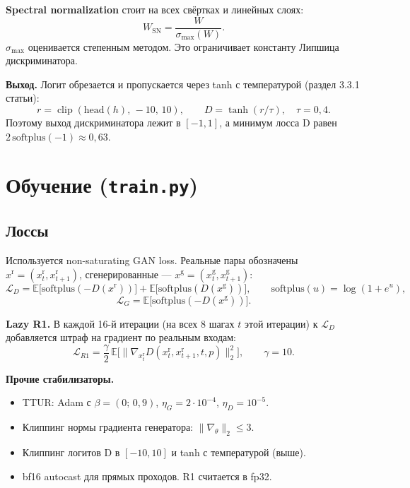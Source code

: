 \documentclass[11pt,a4paper]{article}
\newcommand{\code}[1]{\texttt{#1}}
\newcommand{\E}{\mathbb{E}}
\begin{document}
\textbf{Spectral normalization} стоит на всех свёртках и линейных слоях:
\[
  W_{\mathrm{SN}} = \frac{W}{\sigma_{\max}(W)}.
\]
$\sigma_{\max}$ оценивается степенным методом. Это ограничивает константу Липшица дискриминатора.

\textbf{Выход.} Логит обрезается и пропускается через tanh с температурой (раздел 3.3.1 статьи):
\[
  r = \operatorname{clip}(\mathrm{head}(h),\,-10,\,10),\qquad D = \tanh(r/\tau),\quad \tau=0{,}4.
\]
Поэтому выход дискриминатора лежит в $[-1,1]$, а минимум лосса D равен $2\,\mathrm{softplus}(-1)\approx0{,}63$.

\section{Обучение (\code{train.py})}

\subsection{Лоссы}
Используется non-saturating GAN loss. Реальные пары обозначены $x^{\mathrm r}=(x_t^{\mathrm r}, x_{t+1}^{\mathrm r})$,
сгенерированные — $x^{\mathrm g}=(x_t^{\mathrm g}, x_{t+1}^{\mathrm g})$:
\[
  \mathcal L_D = \E\big[\mathrm{softplus}(-D(x^{\mathrm r}))\big] + \E\big[\mathrm{softplus}(D(x^{\mathrm g}))\big],
  \qquad \mathrm{softplus}(u) = \log(1+e^u),
\]
\[
  \mathcal L_G = \E\big[\mathrm{softplus}(-D(x^{\mathrm g}))\big].
\]

\textbf{Lazy R1.} В каждой 16-й итерации (на всех 8 шагах $t$ этой итерации) к $\mathcal L_D$
добавляется штраф на градиент по реальным входам:
\[
  \mathcal L_{R1} = \frac{\gamma}{2}\,\E\Big[\big\|\nabla_{x_t^{\mathrm r}} D(x_t^{\mathrm r}, x_{t+1}^{\mathrm r}, t, p)\big\|_2^2\Big],\qquad \gamma = 10.
\]

\textbf{Прочие стабилизаторы.}
\begin{itemize}
  \item TTUR: Adam с $\beta=(0;\,0{,}9)$, $\eta_G = 2\cdot10^{-4}$, $\eta_D=10^{-5}$.
  \item Клиппинг нормы градиента генератора: $\|\nabla_\theta\|_2\le3$.
  \item Клиппинг логитов D в $[-10,10]$ и tanh с температурой (выше).
  \item bf16 autocast для прямых проходов. R1 считается в fp32.
\end{itemize}
\end{document}
